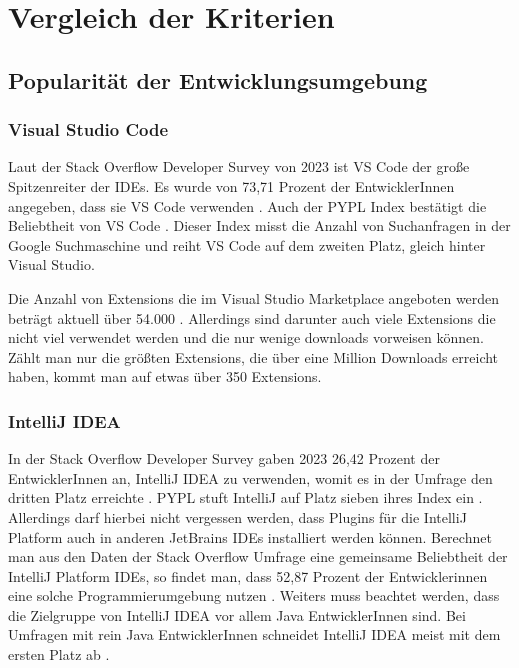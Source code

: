 \chapter{Vergleich der Kriterien}
\label{cha:Vergleich}

\section{Popularität der Entwicklungsumgebung}
\label{sec:Vergleich_Popularität}

\subsection{Visual Studio Code}

Laut der Stack Overflow Developer Survey von 2023 ist
VS Code der große Spitzenreiter der IDEs. Es wurde von
73,71 Prozent der EntwicklerInnen angegeben,
dass sie VS Code verwenden \cite{StackOverflowSurvey2023}.
Auch der PYPL Index bestätigt die Beliebtheit von VS Code \cite{PYPL}.
Dieser Index misst die Anzahl von Suchanfragen in der Google Suchmaschine
und reiht VS Code auf dem zweiten Platz, gleich hinter Visual Studio.

Die Anzahl von Extensions die im Visual Studio Marketplace angeboten werden
beträgt aktuell über 54.000 \cite{VSCodeMarketplace}. Allerdings sind 
darunter auch viele Extensions die nicht viel verwendet werden und die nur
wenige downloads vorweisen können. Zählt man nur die größten 
Extensions, die über eine Million Downloads erreicht haben,
kommt man auf etwas über 350 Extensions.

\subsection{IntelliJ IDEA}

In der Stack Overflow Developer Survey gaben 2023
26,42 Prozent der EntwicklerInnen an, IntelliJ IDEA zu verwenden,
womit es in der Umfrage den dritten Platz erreichte \cite{StackOverflowSurvey2023}.
PYPL stuft IntelliJ auf Platz sieben ihres Index ein \cite{PYPL}.
Allerdings darf hierbei nicht vergessen werden, dass Plugins
für die IntelliJ Platform auch in anderen JetBrains IDEs installiert
werden können. Berechnet man aus den Daten der Stack Overflow Umfrage
eine gemeinsame Beliebtheit der IntelliJ Platform IDEs, so findet man,
dass 52,87 Prozent der Entwicklerinnen eine solche Programmierumgebung nutzen \cite{StackOverflowSurvey}.
Weiters muss beachtet werden, dass die Zielgruppe von IntelliJ IDEA
vor allem Java EntwicklerInnen sind. Bei Umfragen mit rein Java
EntwicklerInnen schneidet IntelliJ IDEA meist mit dem ersten Platz ab \cite{JRebelIDEs,JRebelDeveloperProductivityReport,BetterprojectsfasterPouplarityIndex}.

